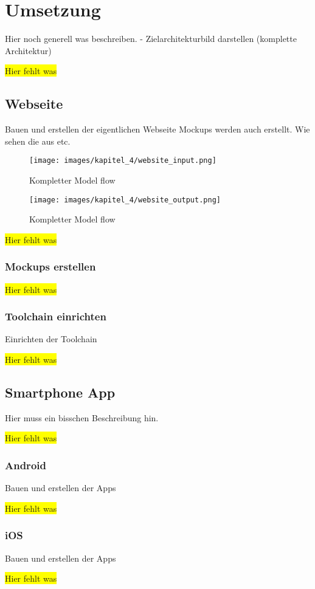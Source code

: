 \section{Umsetzung}
Hier noch generell was beschreiben. - Zielarchitekturbild darstellen (komplette Architektur)

\colorbox{yellow}{Hier fehlt was}

\subsection{Webseite}
\label{subsec:webseite}
Bauen und erstellen der eigentlichen Webseite
Mockups werden auch erstellt. Wie sehen die aus etc.

\begin{figure}[h]
    \centering
    \texttt{[image: images/kapitel\_4/website\_input.png]}
    \caption{Kompletter Model flow}
    \label{fig:umsetzung_model_flow}
\end{figure}

\begin{figure}[h]
    \centering
    \texttt{[image: images/kapitel\_4/website\_output.png]}
    \caption{Kompletter Model flow}
    \label{fig:umsetzung_model_flow}
\end{figure}

\colorbox{yellow}{Hier fehlt was}

\subsubsection{Mockups erstellen}
\colorbox{yellow}{Hier fehlt was}

\subsubsection{Toolchain einrichten}
Einrichten der Toolchain

\colorbox{yellow}{Hier fehlt was}

\subsection{Smartphone App}
Hier muss ein bisschen Beschreibung hin.

\colorbox{yellow}{Hier fehlt was}

\subsubsection{Android}
Bauen und erstellen der Apps

\colorbox{yellow}{Hier fehlt was}

\subsubsection{iOS}
Bauen und erstellen der Apps

\colorbox{yellow}{Hier fehlt was}